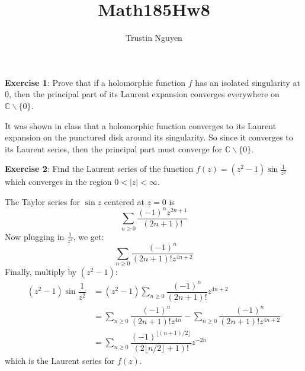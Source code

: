 \documentclass{article}
\title{Math185Hw8}
\author{Trustin Nguyen}
\begin{document}
    \maketitle

\reversemarginpar

\textbf{Exercise 1}: Prove that if a holomorphic function $f$ has an isolated singularity at $0$, then the principal part of its Laurent expansion converges everywhere on $\mathbb{C} \backslash \{0\}$.
    \begin{answer}
        It was shown in class that a holomorphic function converges to its Laurent expansion on the punctured disk around its singularity. So since it converges to its Laurent series, then the principal part must converge for $\mathbb{C} \backslash \{0\}$.
    \end{answer}

\textbf{Exercise 2}: Find the Laurent series of the function $f(z) = (z^{2} - 1) \sin{\frac{1}{z^{2}}}$ which converges in the region $0 < \lvert z \rvert < \infty$.
    \begin{answer}
        The Taylor series for $\sin{z}$ centered at $z = 0$ is
            \begin{equation*}
                \sum_{n \geq 0} \dfrac{(-1)^{n}z^{2n + 1}}{(2n + 1)!}
            \end{equation*}
        Now plugging in $\frac{1}{z^{2}}$, we get:
            \begin{equation*}
                \sum_{n \geq 0} \dfrac{(-1)^{n}}{(2n + 1)!z^{4n + 2}}
            \end{equation*}
        Finally, multiply by $(z^{2} - 1)$:
            \begin{align*}
                (z^{2} - 1)\sin{\dfrac{1}{z^{2}}} &= (z^{2} - 1)\sum_{n \geq 0}\dfrac{(-1)^{n}}{(2n + 1)!}z^{4n + 2}                                         \\
                                                  &= \sum_{n \geq 0}\dfrac{(-1)^{n}}{(2n + 1)!z^{4n}} - \sum_{n \geq 0}\dfrac{(-1)^{n}}{(2n + 1)!z^{4n + 2}} \\
                                                  &= \sum_{n \geq 0}\dfrac{(-1)^{\lfloor (n + 1)/2 \rfloor}}{(2\lfloor n/2 \rfloor + 1)!}z^{-2n}               
            \end{align*}
        which is the Laurent series for $f(z)$.
    \end{answer}
\end{document}
